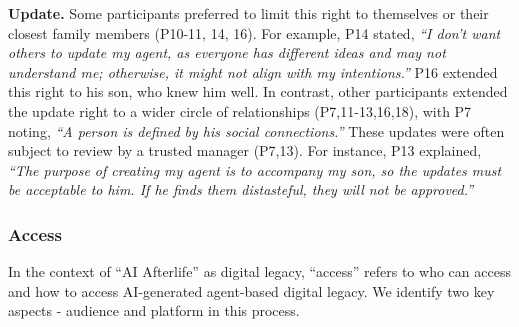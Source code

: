 \textbf{Update.} \label{update}
Some participants preferred to limit this right to themselves or their closest family members (P10-11, 14, 16). For example, P14 stated, \textit{``I don't want others to update my agent, as everyone has different ideas and may not understand me; otherwise, it might not align with my intentions.''} P16 extended this right to his son, who knew him well.
In contrast, other participants extended the update right to a wider circle of relationships (P7,11-13,16,18), with P7 noting, \textit{``A person is defined by his social connections.''} 
These updates were often subject to review by a trusted manager (P7,13). 
For instance, P13 explained, \textit{``The purpose of creating my agent is to accompany my son, so the updates must be acceptable to him. If he finds them distasteful, they will not be approved.''}

\subsubsection{Access}
In the context of ``AI Afterlife'' as digital legacy, ``access'' refers to who can access and how to access AI-generated agent-based digital legacy. We identify two key aspects - audience and platform in this process. 

